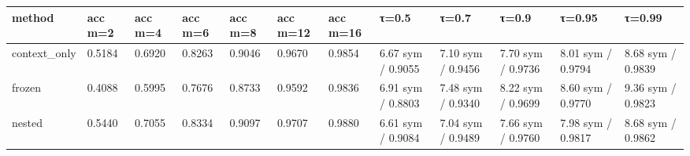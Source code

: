 \begin{tabular}{llllllllllll}
\hline
method & acc m=2 & acc m=4 & acc m=6 & acc m=8 & acc m=12 & acc m=16 & τ=0.5 & τ=0.7 & τ=0.9 & τ=0.95 & τ=0.99 \\
\hline
context\_only & 0.5184 & 0.6920 & 0.8263 & 0.9046 & 0.9670 & 0.9854 & 6.67 sym / 0.9055 & 7.10 sym / 0.9456 & 7.70 sym / 0.9736 & 8.01 sym / 0.9794 & 8.68 sym / 0.9839 \\
frozen & 0.4088 & 0.5995 & 0.7676 & 0.8733 & 0.9592 & 0.9836 & 6.91 sym / 0.8803 & 7.48 sym / 0.9340 & 8.22 sym / 0.9699 & 8.60 sym / 0.9770 & 9.36 sym / 0.9823 \\
nested & 0.5440 & 0.7055 & 0.8334 & 0.9097 & 0.9707 & 0.9880 & 6.61 sym / 0.9084 & 7.04 sym / 0.9489 & 7.66 sym / 0.9760 & 7.98 sym / 0.9817 & 8.68 sym / 0.9862 \\
\hline
\end{tabular}
